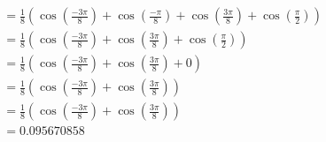\documentclass[answers]{exam}
\begin{document}
\begin{questions}
\begin{parts}
\begin{solution}
\begin{align*}
                      & = \frac{1}{8} \left(\cos \left(\frac{-3 \pi}{8}\right) + \cos \left(\frac{-\pi}{8}\right) + \cos \left(\frac{3 \pi}{8}\right) + \cos \left(\frac{\pi}{2}\right)\right)                                                                                                        \\
                      & = \frac{1}{8} \left(\cos \left(\frac{-3 \pi}{8}\right) + \cos \left(\frac{3 \pi}{8}\right) + \cos \left(\frac{\pi}{2}\right)\right)                                                                                                                                           \\
                      & = \frac{1}{8} \left(\cos \left(\frac{-3 \pi}{8}\right) + \cos \left(\frac{3 \pi}{8}\right) + 0\right)                                                                                                                                                                         \\
                      & = \frac{1}{8} \left(\cos \left(\frac{-3 \pi}{8}\right) + \cos \left(\frac{3 \pi}{8}\right)\right)                                                                                                                                                                             \\
                      & = \frac{1}{8} \left(\cos \left(\frac{-3 \pi}{8}\right) + \cos \left(\frac{3 \pi}{8}\right)\right)                                                                                                                                                                             \\
                      & = 0.095670858
            \end{align*}
        \end{solution}

\end{parts}
\end{questions}
\end{document}

